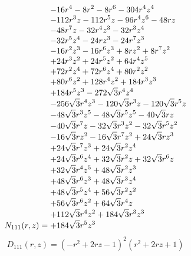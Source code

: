 \documentclass[11pt,a4paper]{article}
\begin{document}
\begin{equation}
N_{111}(r,z)=\shortstack[l]{$\displaystyle  - 16 r^{4} - 8 r^{2} - 8 r^{6} - 304 r^{4} z^{4}$\\
$\displaystyle  - 112 r^{3} z - 112 r^{5} z - 96 r^{4} z^{6} - 48 r z$\\
$\displaystyle  - 48 r^{7} z - 32 r^{4} z^{3} - 32 r^{3} z^{4}$\\
$\displaystyle  - 32 r^{5} z^{4} - 24 r z^{3} - 24 r^{7} z^{3}$\\
$\displaystyle  - 16 r^{2} z^{3} - 16 r^{6} z^{3} + 8 r z^{2} + 8 r^{7} z^{2}$\\
$\displaystyle  + 24 r^{3} z^{2} + 24 r^{5} z^{2} + 64 r^{4} z^{5}$\\
$\displaystyle  + 72 r^{2} z^{4} + 72 r^{6} z^{4} + 80 r^{2} z^{2}$\\
$\displaystyle  + 80 r^{6} z^{2} + 128 r^{4} z^{2} + 184 r^{3} z^{3}$\\
$\displaystyle  + 184 r^{5} z^{3} - 272 \sqrt{3} r^{4} z^{4}$\\
$\displaystyle  - 256 \sqrt{3} r^{4} z^{3} - 120 \sqrt{3} r^{3} z - 120 \sqrt{3} r^{5} z$\\
$\displaystyle  - 48 \sqrt{3} r^{3} z^{5} - 48 \sqrt{3} r^{5} z^{5} - 40 \sqrt{3} r z$\\
$\displaystyle  - 40 \sqrt{3} r^{7} z - 32 \sqrt{3} r^{3} z^{2} - 32 \sqrt{3} r^{5} z^{2}$\\
$\displaystyle  - 16 \sqrt{3} r z^{2} - 16 \sqrt{3} r^{7} z^{2} + 24 \sqrt{3} r z^{3}$\\
$\displaystyle  + 24 \sqrt{3} r^{7} z^{3} + 24 \sqrt{3} r^{2} z^{4}$\\
$\displaystyle  + 24 \sqrt{3} r^{6} z^{4} + 32 \sqrt{3} r^{2} z + 32 \sqrt{3} r^{6} z$\\
$\displaystyle  + 32 \sqrt{3} r^{4} z^{5} + 48 \sqrt{3} r^{2} z^{3}$\\
$\displaystyle  + 48 \sqrt{3} r^{6} z^{3} + 48 \sqrt{3} r^{3} z^{4}$\\
$\displaystyle  + 48 \sqrt{3} r^{5} z^{4} + 56 \sqrt{3} r^{2} z^{2}$\\
$\displaystyle  + 56 \sqrt{3} r^{6} z^{2} + 64 \sqrt{3} r^{4} z$\\
$\displaystyle  + 112 \sqrt{3} r^{4} z^{2} + 184 \sqrt{3} r^{3} z^{3}$\\
$\displaystyle  + 184 \sqrt{3} r^{5} z^{3}$}
\label{eq:cat-numerator-111}
\end{equation}
\begin{equation}
D_{111}(r,z)=\left(- r^{2} + 2 r z - 1\right)^{2} \left(r^{2} + 2 r z + 1\right)
\label{eq:cat-denominator-111}
\end{equation}
\end{document}

